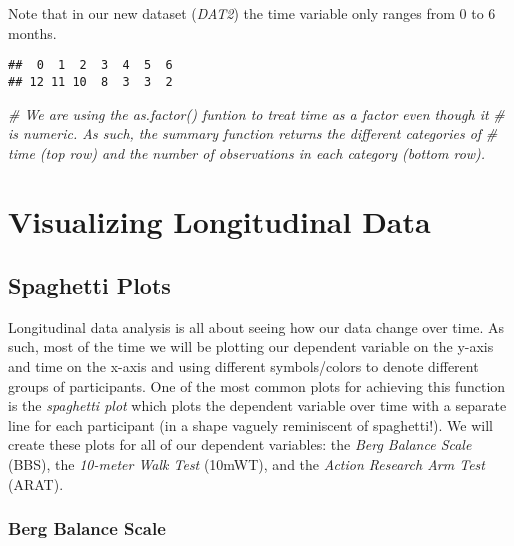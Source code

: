 \documentclass[]{article}
\newenvironment{Shaded}{\begin{snugshade}}{\end{snugshade}}
\newcommand{\KeywordTok}[1]{\textcolor[rgb]{0.13,0.29,0.53}{\textbf{{#1}}}}
\newcommand{\CommentTok}[1]{\textcolor[rgb]{0.56,0.35,0.01}{\textit{{#1}}}}
\newcommand{\NormalTok}[1]{{#1}}
\begin{document}
Note that in our new dataset (\emph{DAT2}) the time variable only ranges
from 0 to 6 months.

\begin{Shaded}
\end{Shaded}

\begin{verbatim}
##  0  1  2  3  4  5  6 
## 12 11 10  8  3  3  2
\end{verbatim}

\begin{Shaded}
\begin{Highlighting}[]
\CommentTok{# We are using the as.factor() funtion to treat time as a factor even though it}
\CommentTok{# is numeric. As such, the summary function returns the different categories of }
\CommentTok{# time (top row) and the number of observations in each category (bottom row).}
\end{Highlighting}
\end{Shaded}

\newpage

\section{Visualizing Longitudinal
Data}\label{visualizing-longitudinal-data}

\subsection{Spaghetti Plots}\label{spaghetti-plots}

Longitudinal data analysis is all about seeing how our data change over
time. As such, most of the time we will be plotting our dependent
variable on the y-axis and time on the x-axis and using different
symbols/colors to denote different groups of participants. One of the
most common plots for achieving this function is the \emph{spaghetti
plot} which plots the dependent variable over time with a separate line
for each participant (in a shape vaguely reminiscent of spaghetti!). We
will create these plots for all of our dependent variables: the
\emph{Berg Balance Scale} (BBS), the \emph{10-meter Walk Test} (10mWT),
and the \emph{Action Research Arm Test} (ARAT).

\subsubsection{Berg Balance Scale}\label{berg-balance-scale}
\end{document}
